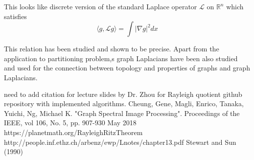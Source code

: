 \documentclass[10pt,a4paper, nocenter]{report}
\newcommand{\abs}[1]{\lvert {#1} \rvert}
\begin{document}
	 This looks like discrete version of the standard Laplace operator $\mathcal{L}$ on $\mathbb{R}^{n}$ which satisfies $$ \langle g,\mathcal{L}g \rangle = \int \abs{\nabla g}^{2} dx$$
	 
	 This relation has been studied and shown to be precise. Apart from the application to partitioning problem,s graph Laplacians have been also studied and used for the connection between topology and properties of graphs and graph Laplacians.
	
	
	
	\thispagestyle{fancy}
	\begin{thebibliography}{9}
	\thispagestyle{fancy}
		 need to add citation for lecture slides by Dr. Zhou for Rayleigh quotient 
		github repository with implemented algorithms. 
		Cheung, Gene, Magli, Enrico, Tanaka, Yuichi, Ng, Michael K. "Graph Spectral Image Processing". Proceedings of the IEEE, vol 106, No. 5, pp. 907-930 May 2018
		 https://planetmath.org/RayleighRitzTheorem
		 http://people.inf.ethz.ch/arbenz/ewp/Lnotes/chapter13.pdf
		Stewart and Sun (1990) 

	\end{thebibliography}
\end{document}
